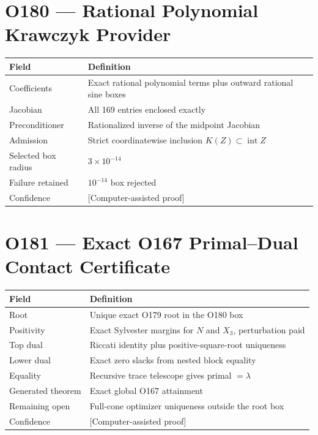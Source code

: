 \documentclass[11pt,a4paper,openany]{report}
\begin{document}
\section{O180 --- Rational Polynomial Krawczyk Provider}

\begin{center}
\begingroup\small
\setlength{\tabcolsep}{2.5pt}
\renewcommand{\arraystretch}{1.16}
\begin{longtable}{@{}p{}p{}@{}}
\toprule
\textbf{Field} & \textbf{Definition} \\
\midrule
\endhead
Coefficients & Exact rational polynomial terms plus outward rational sine boxes \\
Jacobian & All 169 entries enclosed exactly \\
Preconditioner & Rationalized inverse of the midpoint Jacobian \\
Admission & Strict coordinatewise inclusion \(K(Z)\subset\operatorname{int}Z\) \\
Selected box radius & \(3\times10^{-14}\) \\
Failure retained & \(10^{-14}\) box rejected \\
Confidence & \textcolor{fingreen}{[Computer-assisted proof]} \\
\bottomrule
\end{longtable}
\endgroup
\end{center}

\section{O181 --- Exact O167 Primal--Dual Contact Certificate}

\begin{center}
\begingroup\small
\setlength{\tabcolsep}{2.5pt}
\renewcommand{\arraystretch}{1.16}
\begin{longtable}{@{}p{}p{}@{}}
\toprule
\textbf{Field} & \textbf{Definition} \\
\midrule
\endhead
Root & Unique exact O179 root in the O180 box \\
Positivity & Exact Sylvester margins for \(N\) and \(X_3\), perturbation paid \\
Top dual & Riccati identity plus positive-square-root uniqueness \\
Lower dual & Exact zero slacks from nested block equality \\
Equality & Recursive trace telescope gives primal \(=\lambda\) \\
Generated theorem & Exact global O167 attainment \\
Remaining open & Full-cone optimizer uniqueness outside the root box \\
Confidence & \textcolor{fingreen}{[Computer-assisted proof]} \\
\bottomrule
\end{longtable}
\endgroup
\end{center}
\end{document}
